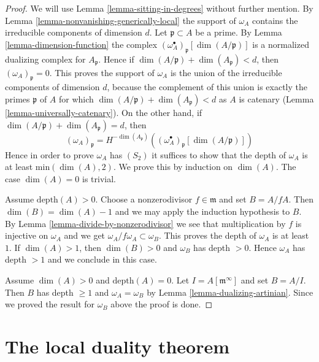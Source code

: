 \begin{proof}
We will use Lemma \ref{lemma-sitting-in-degrees} without further mention.
By Lemma \ref{lemma-nonvanishing-generically-local} the support
of $\omega_A$ contains the irreducible components of dimension $d$.
Let $\mathfrak p \subset A$ be a prime. By Lemma \ref{lemma-dimension-function}
the complex $(\omega_A^\bullet)_{\mathfrak p}[\dim(A/\mathfrak p)]$
is a normalized dualizing complex for $A_\mathfrak p$. Hence if
$\dim(A/\mathfrak p) + \dim(A_\mathfrak p) < d$, then
$(\omega_A)_\mathfrak p = 0$.
This proves the support of $\omega_A$ is the union of the irreducible
components of dimension $d$, because the complement of this union
is exactly the primes $\mathfrak p$ of $A$ for which
$\dim(A/\mathfrak p) + \dim(A_\mathfrak p) < d$ as $A$ is catenary
(Lemma \ref{lemma-universally-catenary}).
On the other hand, if $\dim(A/\mathfrak p) + \dim(A_\mathfrak p) = d$, then
$$
(\omega_A)_\mathfrak p =
H^{-\dim(A_\mathfrak p)}\left(
(\omega_A^\bullet)_{\mathfrak p}[\dim(A/\mathfrak p)] \right)
$$
Hence in order to prove $\omega_A$ has $(S_2)$ it suffices to show that
the depth of $\omega_A$ is at least $\text{min}(\dim(A), 2)$.
We prove this by induction on $\dim(A)$. The case $\dim(A) = 0$ is
trivial.

\medskip\noindent
Assume $\text{depth}(A) > 0$. Choose a nonzerodivisor $f \in \mathfrak m$
and set $B = A/fA$. Then $\dim(B) = \dim(A) - 1$ and we may apply the
induction hypothesis to $B$. By Lemma \ref{lemma-divide-by-nonzerodivisor}
we see that multiplication by $f$ is injective on $\omega_A$ and we get
$\omega_A/f\omega_A \subset \omega_B$. This proves the depth of $\omega_A$
is at least $1$. If $\dim(A) > 1$, then $\dim(B) > 0$ and $\omega_B$
has depth $ > 0$. Hence $\omega_A$ has depth $> 1$ and we conclude in
this case.

\medskip\noindent
Assume $\dim(A) > 0$ and $\text{depth}(A) = 0$. Let
$I = A[\mathfrak m^\infty]$ and set $B = A/I$. Then $B$ has
depth $\geq 1$ and $\omega_A = \omega_B$ by
Lemma \ref{lemma-dualizing-artinian}.
Since we proved the result for $\omega_B$ above the proof is done.
\end{proof}





\section{The local duality theorem}
\label{section-local-duality}

